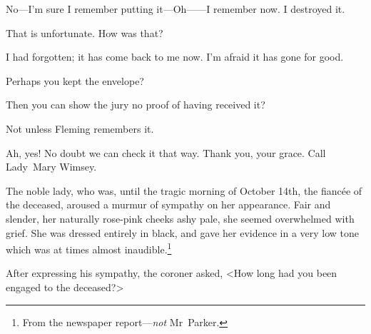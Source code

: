 \begin{dialogue}
 No—I'm sure I remember putting it—Oh——I remember now. I destroyed it.

 That is unfortunate. How was that?

 I had forgotten; it has come back to me now. I'm afraid it has gone for good.

 Perhaps you kept the envelope?

 

 Then you can show the jury no proof of having received it?

 Not unless Fleming remembers it.

 Ah, yes! No doubt we can check it that way. Thank you, your grace. Call Lady~Mary Wimsey.
\end{dialogue}

The noble lady, who was, until the tragic morning of October 14th, the fiancée of the deceased, aroused a murmur of sympathy on her appearance. Fair and slender, her naturally rose-pink cheeks ashy pale, she seemed overwhelmed with grief. She was dressed entirely in black, and gave her evidence in a very low tone which was at times almost inaudible.\footnote{From the newspaper report—\emph{not} Mr~Parker.}

After expressing his sympathy, the coroner asked, <How long had you been engaged to the deceased?>

